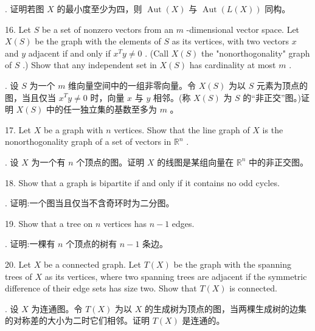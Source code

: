 \documentclass[10pt]{article}
\begin{document}
\begin{tcolorbox}. 证明若图 \(X\) 的最小度至少为四，则 \(\operatorname{Aut}\left( X\right)\) 与 \(\operatorname{Aut}\left( {L\left( X\right) }\right)\) 同构。
\end{tcolorbox}

16. Let \(S\) be a set of nonzero vectors from an \(m\) -dimensional vector space. Let \(X\left( S\right)\) be the graph with the elements of \(S\) as its vertices, with two vectors \(x\) and \(y\) adjacent if and only if \({x}^{T}y \neq  0\) . (Call \(X\left( S\right)\) the "nonorthogonality" graph of \(S\) .) Show that any independent set in \(X\left( S\right)\) has cardinality at most \(m\) .

\begin{tcolorbox}. 设 \(S\) 为一个 \(m\) 维向量空间中的一组非零向量。令 \(X\left( S\right)\) 为以 \(S\) 元素为顶点的图，当且仅当 \({x}^{T}y \neq  0\) 时，向量 \(x\) 与 \(y\) 相邻。(称 \(X\left( S\right)\) 为 \(S\) 的“非正交”图。)证明 \(X\left( S\right)\) 中的任一独立集的基数至多为 \(m\) 。
\end{tcolorbox}

17. Let \(X\) be a graph with \(n\) vertices. Show that the line graph of \(X\) is the nonorthogonality graph of a set of vectors in \({\mathbb{R}}^{n}\) .

\begin{tcolorbox}. 设 \(X\) 为一个有 \(n\) 个顶点的图。证明 \(X\) 的线图是某组向量在 \({\mathbb{R}}^{n}\) 中的非正交图。
\end{tcolorbox}

18. Show that a graph is bipartite if and only if it contains no odd cycles.

\begin{tcolorbox}. 证明:一个图当且仅当不含奇环时为二分图。
\end{tcolorbox}

19. Show that a tree on \(n\) vertices has \(n - 1\) edges.

\begin{tcolorbox}. 证明:一棵有 \(n\) 个顶点的树有 \(n - 1\) 条边。
\end{tcolorbox}

20. Let \(X\) be a connected graph. Let \(T\left( X\right)\) be the graph with the spanning trees of \(X\) as its vertices, where two spanning trees are adjacent if the symmetric difference of their edge sets has size two. Show that \(T\left( X\right)\) is connected.

\begin{tcolorbox}. 设 \(X\) 为连通图。令 \(T\left( X\right)\) 为以 \(X\) 的生成树为顶点的图，当两棵生成树的边集的对称差的大小为二时它们相邻。证明 \(T\left( X\right)\) 是连通的。
\end{tcolorbox}
\end{document}
